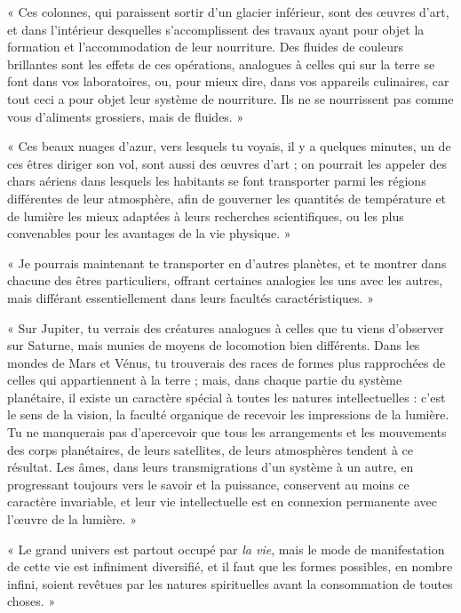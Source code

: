 \documentclass[a4paper, 11pt, oneside]{article}
\begin{document}
« Ces colonnes, qui paraissent sortir d'un glacier inférieur, sont des œuvres d'art, et dans l'intérieur desquelles s'accomplissent des travaux ayant pour objet la formation et l'accommodation de leur nourriture. Des fluides de couleurs brillantes sont les effets de ces opérations, analogues à celles qui sur la terre se font dans vos laboratoires, ou, pour mieux dire, dans vos appareils culinaires, car tout ceci a pour objet leur système de nourriture. Ils ne se nourrissent pas comme vous d'aliments grossiers, mais de fluides. »

« Ces beaux nuages d'azur, vers lesquels tu voyais, il y a quelques minutes, un de ces êtres diriger son vol, sont aussi des œuvres d'art ; on pourrait les appeler des chars aériens dans lesquels les habitants se font transporter parmi les régions différentes de leur atmosphère, afin de gouverner les quantités de température et de lumière les mieux adaptées à leurs recherches scientifiques, ou les plus convenables pour les avantages de la vie physique. »

« Je pourrais maintenant te transporter en d'autres planètes, et te montrer dans chacune des êtres particuliers, offrant certaines analogies les uns avec les autres, mais différant essentiellement dans leurs facultés caractéristiques. »

« Sur Jupiter, tu verrais des créatures analogues à celles que tu viens d'observer sur Saturne, mais munies de moyens de locomotion bien différents. Dans les mondes de Mars et Vénus, tu trouverais des races de formes plus rapprochées de celles qui appartiennent à la terre ; mais, dans chaque partie du système planétaire, il existe un caractère spécial à toutes les natures intellectuelles : c'est le sens de la vision, la faculté organique de recevoir les impressions de la lumière. Tu ne manquerais pas d'apercevoir que tous les arrangements et les mouvements des corps planétaires, de leurs satellites, de leurs atmosphères tendent à ce résultat. Les âmes, dans leurs transmigrations d'un système à un autre, en progressant toujours vers le savoir et la puissance, conservent au moins ce caractère invariable, et leur vie intellectuelle est en connexion permanente avec l'œuvre de la lumière. »

« Le grand univers est partout occupé par \emph{la vie}, mais le mode de manifestation de cette vie est infiniment diversifié, et il faut que les formes possibles, en nombre infini, soient revêtues par les natures spirituelles avant la consommation de toutes choses. »
\end{document}
